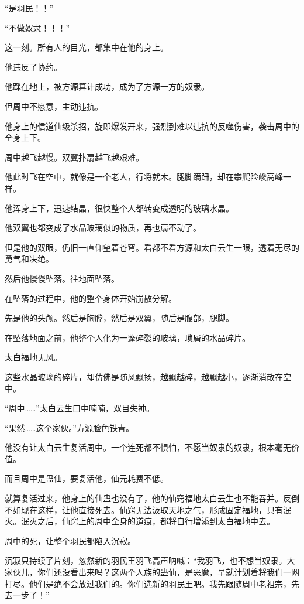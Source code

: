 \begin{this_body}
“是羽民！！”

“不做奴隶！！！”

这一刻。所有人的目光，都集中在他的身上。

他违反了协约。

他踩在地上，被方源算计成功，成为了方源一方的奴隶。

但周中不愿意，主动违抗。

他身上的信道仙级杀招，旋即爆发开来，强烈到难以违抗的反噬伤害，袭击周中的全身上下。

周中越飞越慢。双翼扑扇越飞越艰难。

他此时飞在空中，就像是一个老人，行将就木。腿脚蹒跚，却在攀爬险峻高峰一样。

他浑身上下，迅速结晶，很快整个人都转变成透明的玻璃水晶。

他双翼也都变成了水晶玻璃似的物质，再也扇不动了。

但是他的双眼，仍旧一直仰望着苍穹。看都不看方源和太白云生一眼，透着无尽的勇气和决绝。

然后他慢慢坠落。往地面坠落。

在坠落的过程中，他的整个身体开始崩散分解。

先是他的头颅。然后是胸膛，然后是双翼，随后是腹部，腿脚。

在坠落地面之前，他整个人化为一蓬碎裂的玻璃，琐屑的水晶碎片。

太白福地无风。

这些水晶玻璃的碎片，却仿佛是随风飘扬，越飘越碎，越飘越小，逐渐消散在空中。

“周中……”太白云生口中喃喃，双目失神。

“果然……这个家伙。”方源脸色铁青。

他没有让太白云生复活周中。一个连死都不惧怕，不愿当奴隶的奴隶，根本毫无价值。

而且周中是蛊仙，要复活他，仙元耗费不低。

就算复活过来，他身上的仙蛊也没有了，他的仙窍福地太白云生也不能吞并。反倒不如现在这样，让他直接死去。仙窍无法汲取天地之气，形成固定福地，只有泯灭。泯灭之后，仙窍上的周中全身的道痕，都将自行增添到太白福地中去。

周中的死，让整个羽民都陷入沉寂。

沉寂只持续了片刻，忽然新的羽民王羽飞高声呐喊：“我羽飞，也不想当奴隶。大家伙儿，你们还没看出来吗？这两个人族的蛊仙，是恶魔，早就计划着将我们一网打尽。他们是绝不会放过我们的。你们选新的羽民王吧。我先跟随周中老祖宗，先去一步了！”


\end{this_body}
